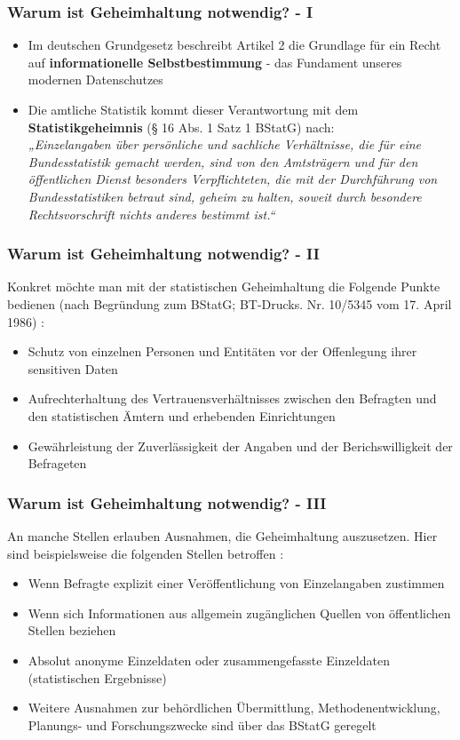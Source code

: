 \documentclass[aspectratio=169]{beamer}
\begin{document}
\begin{frame}{}
    \frametitle{Warum ist Geheimhaltung notwendig? - I}
    \begin{itemize}
        \item Im deutschen Grundgesetz beschreibt Artikel 2 die Grundlage für ein Recht auf \textbf{informationelle Selbstbestimmung} - das Fundament unseres modernen Datenschutzes
        \item Die amtliche Statistik kommt dieser Verantwortung mit dem \textbf{Statistikgeheimnis} (§ 16 Abs. 1 Satz 1 BStatG) \cite{Nickl} nach: \\
        \textit{„Einzelangaben über persönliche und sachliche Verhältnisse, die für eine Bundesstatistik
        gemacht werden, sind von den Amtsträgern und für den öffentlichen Dienst besonders
        Verpflichteten, die mit der Durchführung von Bundesstatistiken betraut sind, geheim zu halten,
        soweit durch besondere Rechtsvorschrift nichts anderes bestimmt ist.“}
    \end{itemize}
\end{frame}


\begin{frame}{}
    \frametitle{Warum ist Geheimhaltung notwendig? - II}
    Konkret möchte man mit der statistischen Geheimhaltung die Folgende Punkte bedienen (nach Begründung zum BStatG; BT-Drucks. Nr. 10/5345 vom 17. April 1986) \cite{Nickl}:
    \begin{itemize}
        \item Schutz von einzelnen Personen und Entitäten vor der Offenlegung ihrer sensitiven Daten
        \item Aufrechterhaltung des Vertrauensverhältnisses zwischen den Befragten und den statistischen Ämtern und erhebenden Einrichtungen
        \item Gewährleistung der Zuverlässigkeit der Angaben und der Berichswilligkeit der Befrageten
    \end{itemize}
\end{frame}


\begin{frame}{}
    \frametitle{Warum ist Geheimhaltung notwendig? - III}
    An manche Stellen erlauben Ausnahmen, die Geheimhaltung auszusetzen. Hier sind beispielsweise die folgenden Stellen betroffen \cite{Nickl}:
    \begin{itemize}
        \item Wenn Befragte explizit einer Veröffentlichung von Einzelangaben zustimmen
        \item Wenn sich Informationen aus allgemein zugänglichen Quellen von öffentlichen Stellen beziehen
        \item Absolut anonyme Einzeldaten oder zusammengefasste Einzeldaten (statistischen Ergebnisse)
        \item Weitere Ausnahmen zur behördlichen Übermittlung, Methodenentwicklung, Planungs- und Forschungszwecke sind über das BStatG geregelt
    \end{itemize}
\end{frame}
\end{document}

